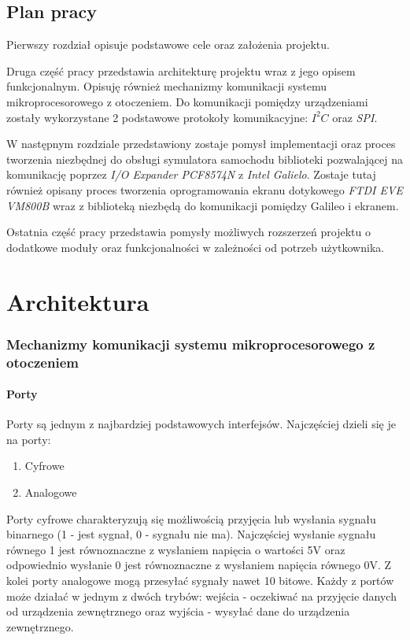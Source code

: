 \documentclass{xmgr}
\begin{document}
\section{Plan pracy}
Pierwszy rozdział opisuje podstawowe cele oraz założenia projektu.

Druga część pracy przedstawia architekturę projektu wraz z jego opisem funkcjonalnym. Opisuję również mechanizmy komunikacji systemu mikroprocesorowego z otoczeniem. Do komunikacji pomiędzy urządzeniami zostały wykorzystane 2 podstawowe protokoły komunikacyjne: \emph{$I^2C$} oraz \emph{SPI}.

W następnym rozdziale przedstawiony zostaje pomysł implementacji oraz proces tworzenia niezbędnej do obsługi symulatora samochodu biblioteki pozwalającej na komunikację poprzez \emph{I/O Expander PCF8574N} z \emph{Intel Galielo}. Zostaje tutaj również opisany proces tworzenia oprogramowania ekranu dotykowego \emph{FTDI EVE VM800B} wraz z biblioteką niezbędą do komunikacji pomiędzy Galileo i ekranem.

Ostatnia część pracy przedstawia pomysły  możliwych rozszerzeń projektu o dodatkowe moduły oraz funkcjonalności w zależności od potrzeb użytkownika.

\chapter{Architektura}
\subsection{Mechanizmy komunikacji systemu mikroprocesorowego z otoczeniem}
\subsubsection{Porty}

Porty są jednym z najbardziej podstawowych interfejsów. Najczęściej dzieli się je na porty:
\begin{enumerate}
	\item Cyfrowe
	\item Analogowe
\end{enumerate}

Porty cyfrowe charakteryzują się możliwością przyjęcia lub wysłania sygnału binarnego (1 - jest sygnał, 0 - sygnału nie ma). Najczęściej wysłanie sygnału równego 1 jest równoznaczne z wysłaniem napięcia o wartości 5V oraz odpowiednio wysłanie 0 jest równoznaczne z wysłaniem napięcia równego 0V. Z kolei porty analogowe mogą przesyłać sygnały nawet 10 bitowe. Każdy z portów może działać w jednym  z dwóch trybów: wejścia - oczekiwać na przyjęcie danych od urządzenia zewnętrznego oraz wyjścia - wysyłać dane do urządzenia zewnętrznego.
\end{document}
